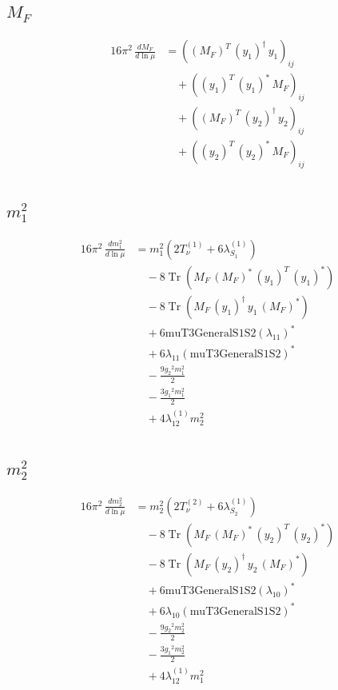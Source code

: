 \documentclass[10pt,a4paper]{article}
\begin{document}
\subsection*{$M_F$}
\begin{align*}
16\pi^2\,\frac{d M_F}{d\ln\mu} &=\left(\left({M_F}\right)^{T}\,\left({y_1}\right)^{\dagger}\,{y_1}\right)_{ij} \\
&\quad +\left(\left({y_1}\right)^{T}\,\left({y_1}\right)^{*}\,{M_F}\right)_{ij} \\
&\quad +\left(\left({M_F}\right)^{T}\,\left({y_2}\right)^{\dagger}\,{y_2}\right)_{ij} \\
&\quad +\left(\left({y_2}\right)^{T}\,\left({y_2}\right)^{*}\,{M_F}\right)_{ij} \\
\end{align*}
\subsection*{$m_1^2$}
\begin{align*}
16\pi^2\,\frac{d m_1^2}{d\ln\mu} &={m_1^2} (2 T_{\nu}^{(1)}+6 {\lambda_{S_1}^{(1)}}) \\
&\quad -8 \operatorname{Tr}\!\left({M_F}\,\left({M_F}\right)^{*}\,\left({y_1}\right)^{T}\,\left({y_1}\right)^{*}\right) \\
&\quad -8 \operatorname{Tr}\!\left({M_F}\,\left({y_1}\right)^{\dagger}\,{y_1}\,\left({M_F}\right)^{*}\right) \\
&\quad +6 \text{muT3GeneralS1S2} \left({\lambda_{11}}\right)^{*} \\
&\quad +6 {\lambda_{11}} \left(\text{muT3GeneralS1S2}\right)^{*} \\
&\quad -\frac{9 {g_2}^2 {m_1^2}}{2} \\
&\quad -\frac{3 {g_1}^2 {m_1^2}}{2} \\
&\quad +4 {\lambda_{12}^{(1)}} {m_2^2} \\
\end{align*}
\subsection*{$m_2^2$}
\begin{align*}
16\pi^2\,\frac{d m_2^2}{d\ln\mu} &={m_2^2} (2 T_{\nu}^{(2)}+6 {\lambda_{S_2}^{(1)}}) \\
&\quad -8 \operatorname{Tr}\!\left({M_F}\,\left({M_F}\right)^{*}\,\left({y_2}\right)^{T}\,\left({y_2}\right)^{*}\right) \\
&\quad -8 \operatorname{Tr}\!\left({M_F}\,\left({y_2}\right)^{\dagger}\,{y_2}\,\left({M_F}\right)^{*}\right) \\
&\quad +6 \text{muT3GeneralS1S2} \left({\lambda_{10}}\right)^{*} \\
&\quad +6 {\lambda_{10}} \left(\text{muT3GeneralS1S2}\right)^{*} \\
&\quad -\frac{9 {g_2}^2 {m_2^2}}{2} \\
&\quad -\frac{3 {g_1}^2 {m_2^2}}{2} \\
&\quad +4 {\lambda_{12}^{(1)}} {m_1^2} \\
\end{align*}
\end{document}

